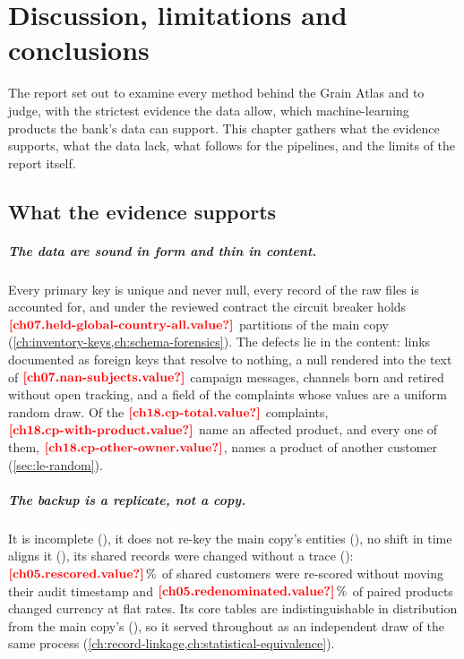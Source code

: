 \chapter{Discussion, limitations and conclusions}\label{ch:conclusions}

The report set out to examine every method behind the Grain Atlas and to judge, with the strictest evidence the data
allow, which machine-learning products the bank's data can support. This chapter gathers what the evidence supports,
what the data lack, what follows for the pipelines, and the limits of the report itself.

\section{What the evidence supports}\label{sec:cc-supports}

\paragraph{The data are sound in form and thin in content.} Every primary key is unique and never null, every record
of the raw files is accounted for, and under the reviewed contract the circuit breaker holds
$\est{ch07.held-global-country-all}{value}$ partitions of the main copy (\cref{ch:inventory-keys,ch:schema-forensics}).
The defects lie in the content: links documented as foreign keys that resolve to nothing, a null rendered into the text
of $\est{ch07.nan-subjects}{value}$ campaign messages, channels born and retired without open tracking, and a field of
the complaints whose values are a uniform random draw. Of the $\est{ch18.cp-total}{value}$ complaints,
$\est{ch18.cp-with-product}{value}$ name an affected product, and every one of them,
$\est{ch18.cp-other-owner}{value}$, names a product of another customer (\cref{sec:le-random}).

\paragraph{The backup is a replicate, not a copy.} It is incomplete (), it does not re-key the main copy's
entities (), no shift in time aligns it (), its shared records were changed without a trace
(): $\est{ch05.rescored}{value}\,\%$ of shared customers were re-scored without moving their audit timestamp
and $\est{ch05.redenominated}{value}\,\%$ of paired products changed currency at flat rates. Its core tables are
indistinguishable in distribution from the main copy's (), so it served throughout as an independent draw of
the same process (\cref{ch:record-linkage,ch:statistical-equivalence}).

